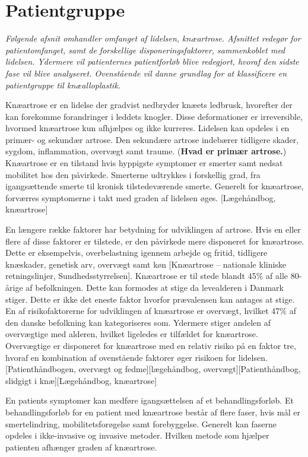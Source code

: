 \section{Patientgruppe}
\textit{Følgende afsnit omhandler omfanget af lidelsen, knæartrose. Afsnittet redegør for patientomfanget, samt de forskellige disponeringsfaktorer, sammenkoblet med lidelsen. Ydermere vil patienternes patientforløb blive redegjort, hvoraf den sidste fase vil blive analyseret. Ovenstående vil danne grundlag for at klassificere en patientgruppe til knæalloplastik.}

Knæartrose er en lidelse der gradvist nedbryder knæets ledbrusk, hvorefter der kan forekomme forandringer i leddets knogler. Disse deformationer er irreversible, hvormed knæartrose kun afhjælpes og ikke kurreres. Lidelsen kan opdeles i en primær- og sekundær artrose. Den sekundære artrose indebærer tidligere skader, sygdom, inflammation, overvægt samt traume. (\textbf{Hvad er primær artrose.}) Knæartrose er en tilstand hvis hyppigste symptomer er smerter samt nedsat mobilitet hos den påvirkede. Smerterne udtrykkes i forskellig grad, fra igangsættende smerte til kronisk tilstedeværende smerte. Generelt for knæartrose, forværres symptomerne i takt med graden af lidelsen øges. [Lægehåndbog, knæartrose]

En længere række faktorer har betydning for udviklingen af artrose. Hvis en eller flere af disse faktorer er tilstede, er den påvirkede mere disponeret for knæartrose. Dette er eksempelvis, overbelastning igennem arbejde og fritid, tidligere knæskader, genetisk arv, overvægt samt køn [Knæartrose – nationale kliniske retningslinjer, Sundhedsstyrrelsen]. Knæartrose er til stede blandt 45\% af alle 80-årige af befolkningen. Dette kan formodes at stige da levealderen i Danmark stiger. Dette er ikke det eneste faktor hvorfor prævalensen kan antages at stige. En af risikofaktorerne for udviklingen af knæartrose er overvægt, hvilket 47\% af den danske befolkning kan kategoriseres som. Ydermere stiger andelen af overvægtige med alderen, hvilket ligeledes er tilfældet for knæartrose. Overvægtige er disponeret for knæartrose med en relativ risiko på en faktor tre, hvoraf en kombination af ovenstående faktorer øger risikoen for lidelsen. [Patienthåndbogen, overvægt og fedme][lægehåndbog, overvægt][Patienthåndbog, slidgigt i knæ][Lægehåndbog, knæartrose]

En patients symptomer kan medføre igangsættelsen af et behandlingsforløb. Et behandlingsforløb for en patient med knæartrose består af flere faser, hvis mål er smertelindring, mobilitetsforøgelse samt forebyggelse. Generelt kan faserne opdeles i ikke-invasive og invasive metoder. Hvilken metode som hjælper patienten afhænger graden af knæartrose. 


